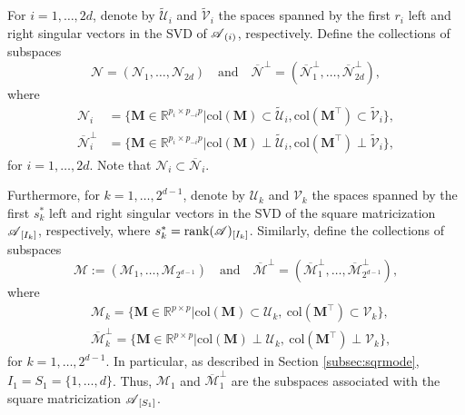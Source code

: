 \documentclass[12pt]{article}
\newcommand{\bm}{\boldsymbol}
\newcommand{\cm}[1]{\mbox{\boldmath$\mathscr{#1}$}}
\begin{document}
For $i=1,\dots,2d$,  denote by $\widetilde{\mathcal{U}}_i$ and $\widetilde{\mathcal{V}}_i$ the spaces spanned by the first $r_i$ left and right singular vectors in the SVD of $\cm{A}_{(i)}$, respectively.  
Define the  collections of subspaces
\begin{equation*}
	\mathcal{N}=(\mathcal{N}_1,\dots,\mathcal{N}_{2d}) \quad \text{and} \quad  \overline{\mathcal{N}}^\perp=(\overline{\mathcal{N}}_1^\perp,\dots,\overline{\mathcal{N}}_{2d}^\perp),
\end{equation*}
where
\begin{equation}\begin{split}
\mathcal{N}_i&=\{\bm{M}\in\mathbb{R}^{p_i\times p_{-i}p}|\text{col}(\bm{M})\subset\widetilde{\mathcal{U}}_i,\text{col}(\bm{M}^\top)\subset\widetilde{\mathcal{V}}_i\},\\
\overline{\mathcal{N}}_i^\perp&=\{\bm{M}\in\mathbb{R}^{p_i\times p_{-i}p}|\text{col}(\bm{M})\perp\widetilde{\mathcal{U}}_i,\text{col}(\bm{M}^\top)\perp\widetilde{\mathcal{V}}_i\}, \label{eq:subspace_N}
\end{split}\end{equation}
for $i=1,\dots,2d$.
Note that $\mathcal{N}_i\subset\overline{\mathcal{N}}_i$.

Furthermore, for $k=1,\dots, 2^{d-1}$, denote by $\mathcal{U}_{k}$ and $\mathcal{V}_k$ the spaces spanned by the first $s_k^*$ left and right singular vectors in the SVD of the square matricization $\cm{A}_{[I_k]}$, respectively, where $s_k^*=\textup{rank}(\cm{A})_{[I_k]}$. Similarly, define the collections of subspaces
\begin{equation*}
\mathcal{M}:=(\mathcal{M}_1,\dots,\mathcal{M}_{2^{d-1}})
\quad \text{and} \quad 
\overline{\mathcal{M}}^\perp=(\overline{\mathcal{M}}_1^\perp,\dots,\overline{\mathcal{M}}_{2^{d-1}}^\perp),
\end{equation*}
where
\begin{equation}\begin{split}
&\mathcal{M}_k=\{\bm{M}\in\mathbb{R}^{p\times p}|\text{col}(\bm{M})\subset \mathcal{U}_k,~\text{col}(\bm{M}^\top)\subset \mathcal{V}_k\},\\
&\overline{\mathcal{M}}_k^\perp=\{\bm{M}\in\mathbb{R}^{p\times p}|\text{col}(\bm{M})\perp\mathcal{U}_k,~\text{col}(\bm{M}^\top)\perp \mathcal{V}_k\}, \label{eq:subspace_M}
\end{split}\end{equation}
for $k=1,\dots,2^{d-1}$.  In particular, as described in Section \ref{subsec:sqrmode},  $I_1=S_1=\{1,\dots,d\}$.  Thus, $\mathcal{M}_1$ and $\overline{\mathcal{M}}_1^\perp$ are the subspaces associated with the square matricization $\cm{A}_{[S_1]}$.
\end{document}
